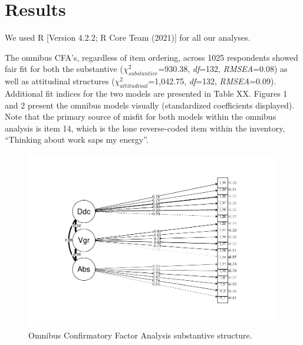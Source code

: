 \documentclass[
  man]{apa6}
\begin{document}
\hypertarget{results-1}{%
\section{Results}\label{results-1}}

We used R {[}Version 4.2.2; R Core Team (2021){]} for all our analyses.

The omnibus CFA's, regardless of item ordering, across 1025 respondents showed fair fit for both the substantive (\(\chi^2_{substantive}\)=930.38, \emph{df}=132, \emph{RMSEA}=0.08) as well as attitudinal structures (\(\chi^2_{attitudinal}\)=1,042.75, \emph{df}=132, \emph{RMSEA}=0.09). Additional fit indices for the two models are presented in Table XX. Figures 1 and 2 present the omnibus models visually (standardized coefficients displayed). Note that the primary source of misfit for both models within the omnibus analysis is item 14, which is the lone reverse-coded item within the inventory, ``Thinking about work saps my energy''.

\begin{figure}
\centering
\includegraphics{EngagementPaper2_files/figure-latex/semplotsub-1.pdf}
\caption{\label{fig:semplotsub}Omnibus Confirmatory Factor Analysis substantive structure.}
\end{figure}
\end{document}
